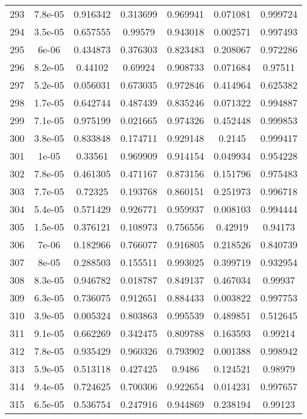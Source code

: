\begin{table}
\begin{tabular}{c|c|c|c|c|c|c}
293 & 7.8e-05 & 0.916342 & 0.313699 & 0.969941 & 0.071081 & 0.999724\\
294 & 3.5e-05 & 0.657555 & 0.99579 & 0.943018 & 0.002571 & 0.997493\\
295 & 6e-06 & 0.434873 & 0.376303 & 0.823483 & 0.208067 & 0.972286\\
296 & 8.2e-05 & 0.44102 & 0.69924 & 0.908733 & 0.071684 & 0.97511\\
297 & 5.2e-05 & 0.056031 & 0.673035 & 0.972846 & 0.414964 & 0.625382\\
298 & 1.7e-05 & 0.642744 & 0.487439 & 0.835246 & 0.071322 & 0.994887\\
299 & 7.1e-05 & 0.975199 & 0.021665 & 0.974326 & 0.452448 & 0.999853\\
300 & 3.8e-05 & 0.833848 & 0.174711 & 0.929148 & 0.2145 & 0.999417\\
301 & 1e-05 & 0.33561 & 0.969909 & 0.914154 & 0.049934 & 0.954228\\
302 & 7.8e-05 & 0.461305 & 0.471167 & 0.873156 & 0.151796 & 0.975483\\
303 & 7.7e-05 & 0.72325 & 0.193768 & 0.860151 & 0.251973 & 0.996718\\
304 & 5.4e-05 & 0.571429 & 0.926771 & 0.959937 & 0.008103 & 0.994444\\
305 & 1.5e-05 & 0.376121 & 0.108973 & 0.756556 & 0.42919 & 0.94173\\
306 & 7e-06 & 0.182966 & 0.766077 & 0.916805 & 0.218526 & 0.840739\\
307 & 8e-05 & 0.288503 & 0.155511 & 0.993025 & 0.399719 & 0.932954\\
308 & 8.3e-05 & 0.946782 & 0.018787 & 0.849137 & 0.467034 & 0.99937\\
309 & 6.3e-05 & 0.736075 & 0.912651 & 0.884433 & 0.003822 & 0.997753\\
310 & 3.9e-05 & 0.005324 & 0.803863 & 0.995539 & 0.489851 & 0.512645\\
311 & 9.1e-05 & 0.662269 & 0.342475 & 0.809788 & 0.163593 & 0.99214\\
312 & 7.8e-05 & 0.935429 & 0.960326 & 0.793902 & 0.001388 & 0.998942\\
313 & 5.9e-05 & 0.513118 & 0.427425 & 0.9486 & 0.124521 & 0.98979\\
314 & 9.4e-05 & 0.724625 & 0.700306 & 0.922654 & 0.014231 & 0.997657\\
315 & 6.5e-05 & 0.536754 & 0.247916 & 0.944869 & 0.238194 & 0.99123\\
\end{tabular}
\end{table}
